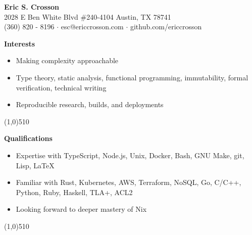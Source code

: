 \documentclass{report}
\newcommand{\cut}{\begin{center} \line(1,0){510} \end{center}}
\begin{document}
\pagestyle{empty}
\setlength\parindent{0pt}

\begin{center}
  \textbf{Eric S. Crosson} \\
  2028 E Ben White Blvd \#240-4104 Austin, TX 78741 \\
  (360) 820 - 8196 $\cdot$ esc@ericcrosson.com $\cdot$ github.com/ericcrosson
\end{center}

\textbf{Interests}
\begin{itemize}[label=$\cdot$]
\item Making complexity approachable
\item Type theory, static analysis, functional programming, immutability, formal verification, technical writing
\item Reproducible research, builds, and deployments
\end{itemize}

\cut{}

\textbf{Qualifications}
\begin{itemize}[label=$\cdot$]
\item Expertise with TypeScript, Node.js, Unix, Docker, Bash, GNU Make, git, Lisp, \LaTeX{}
\item Familiar with Rust, Kubernetes, AWS, Terraform, NoSQL, Go, C/C++, Python, Ruby, Haskell, TLA+, ACL2
\item Looking forward to deeper mastery of Nix
\end{itemize}

\cut{}
\end{document}
